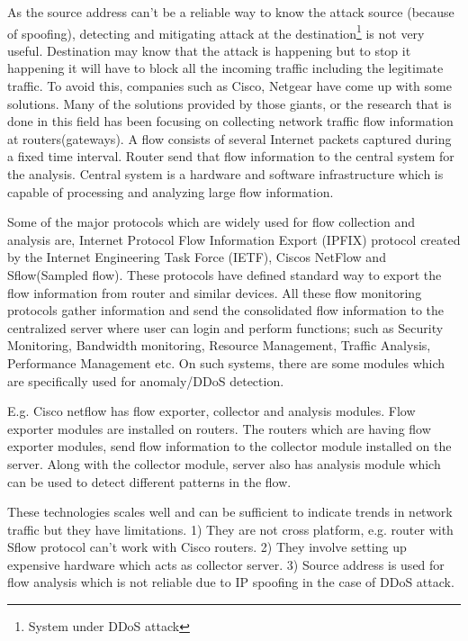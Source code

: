 \documentclass[12pt,oneside,a4paper]{article}
\begin{document}
As the source address can't be a reliable way to know the attack source (because of spoofing), detecting and mitigating attack at the destination\footnote{System under DDoS attack} is not very useful. Destination may know that the attack is happening but to stop it happening it will have to block all the incoming traffic including the legitimate traffic. To avoid this, companies such as Cisco, Netgear have come up with some solutions. Many of the solutions provided by those giants, or the research that is done in this field has been focusing on collecting network traffic flow information\cite{network-traffic-flow} at routers(gateways). A flow consists of several Internet packets captured during a fixed time interval. Router send that flow information to the central system for the analysis. Central system is a hardware and software infrastructure which is capable of processing and analyzing large flow information.\par

Some of the major protocols which are widely used for flow collection and analysis are, Internet Protocol Flow Information Export (IPFIX) protocol created by the Internet Engineering Task Force (IETF), Ciscos NetFlow\cite{cisco-netflow} and Sflow(Sampled flow)\cite{sflow}. These protocols have defined standard way to export the flow information from router and similar devices. All these flow monitoring protocols gather information and send the consolidated flow information to the centralized server where user can login and perform functions; such as Security Monitoring, Bandwidth monitoring, Resource Management, Traffic Analysis, Performance Management etc. On such systems, there are some modules which are specifically used for anomaly/DDoS detection.\par

E.g. Cisco netflow has flow exporter, collector and analysis modules. Flow exporter modules are installed on routers. The routers which are having flow exporter modules, send flow information to the collector module installed on the server. Along with the collector module, server also has analysis module which can be used to detect different patterns in the flow.\par

These technologies scales well and can be sufficient to indicate trends in network traffic but they have limitations. 1) They are not cross platform, e.g. router with Sflow protocol can't work with Cisco routers. 2) They involve setting up expensive hardware which acts as collector server. 3) Source address is used for flow analysis which is not reliable due to IP spoofing in the case of DDoS attack.\par
\end{document}
